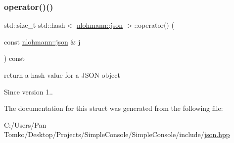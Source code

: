 \subsubsection{\texorpdfstring{operator()()}{operator()()}}
{\footnotesize\ttfamily std\+::size\+\_\+t std\+::hash$<$ \mbox{\hyperlink{namespacenlohmann_a2bfd99e845a2e5cd90aeaf1b1431f474}{nlohmann\+::json}} $>$\+::operator() (\begin{DoxyParamCaption}\item[{const \mbox{\hyperlink{namespacenlohmann_a2bfd99e845a2e5cd90aeaf1b1431f474}{nlohmann\+::json}} \&}]{j }\end{DoxyParamCaption}) const\hspace{0.3cm}{\ttfamily [inline]}}



return a hash value for a J\+S\+ON object 

\begin{DoxySince}{Since}
version 1.. 
\end{DoxySince}


The documentation for this struct was generated from the following file\+:\begin{DoxyCompactItemize}
\item 
C\+:/\+Users/\+Pan Tomko/\+Desktop/\+Projects/\+Simple\+Console/\+Simple\+Console/include/\mbox{\hyperlink{json_8hpp}{json.\+hpp}}\end{DoxyCompactItemize}
